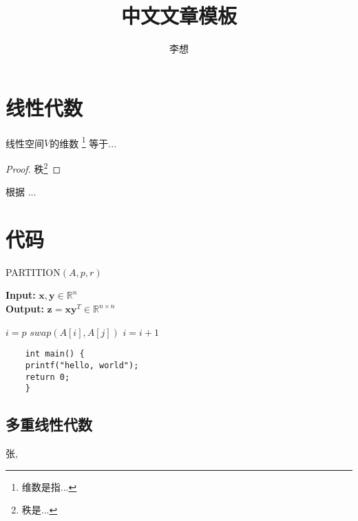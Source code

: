\documentclass{ctexart}
\title{\textbf{中文文章模板}}
\author{李想}
\date{}
\newtheorem{theorem}{定理}[section]
\begin{document}
\maketitle

\tableofcontents
\newpage

\setcounter{page}{1}

\section{线性代数}

\begin{tcolorbox}
[colframe=cyan!40!black,
title={\begin{theorem}
[秩-零化度]\end{theorem}}]
线性空间$V$的维数
\footnote{维数是指...}
等于...
\end{tcolorbox}

\begin{proof}
    秩\footnote{秩是...}
\end{proof}
根据 ...\cite{ref1}

\newpage

\section{代码}
\begin{algorithm}[!h]
	\caption{PARTITION$(A,p,r)$}%
	\textbf{Input: }{$\mathbf{x},
    \mathbf{y}\in\mathbb{R}^n$}\\
    \textbf{Output:}
    {$\mathbf{z}=\mathbf{x}
    \mathbf{y}^T\in\mathbb{R}^{n\times n}$}
    \begin{algorithmic}[1]%
		\STATE $i=p$
		\STATE $swap(A[i],A[j])$
		\STATE $i=i+1$
		\ENDIF
		\ENDFOR
    \end{algorithmic}
\end{algorithm}

\begin{verbatim}
    int main() {
    printf("hello, world");
    return 0;
    }
\end{verbatim}

\newpage

\begin{appendices}
\section{多重线性代数}
\end{appendices}
\newpage

\begin{thebibliography}{99}
张,
\end{thebibliography}
\end{document}
